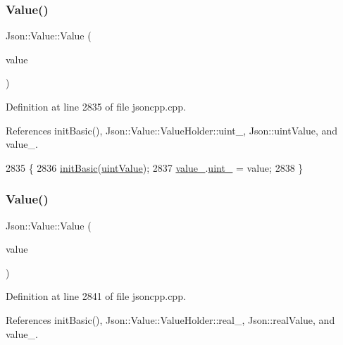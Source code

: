 \subsubsection{\texorpdfstring{Value()}{Value()}\hspace{0.1cm}{\footnotesize\ttfamily [5/12]}}
{\footnotesize\ttfamily Json\+::\+Value\+::\+Value (\begin{DoxyParamCaption}\item[{\hyperlink{class_json_1_1_value_a8b62564be8c087c6d18de180ff4e13e3}{U\+Int64}}]{value }\end{DoxyParamCaption})}



Definition at line 2835 of file jsoncpp.\+cpp.



References init\+Basic(), Json\+::\+Value\+::\+Value\+Holder\+::uint\+\_\+, Json\+::uint\+Value, and value\+\_\+.


\begin{DoxyCode}
2835                          \{
2836   \hyperlink{class_json_1_1_value_a32b86b71564157f40f880f5736be822a}{initBasic}(\hyperlink{namespace_json_a7d654b75c16a57007925868e38212b4eaea788d9a3bb00adc6d68d97d43e1ccd3}{uintValue});
2837   \hyperlink{class_json_1_1_value_aef578244546212705b9f81eb84d7e151}{value\_}.\hyperlink{union_json_1_1_value_1_1_value_holder_aab65665dc15a24a29a8e93cdeeaa7e50}{uint\_} = value;
2838 \}
\end{DoxyCode}
\mbox{\label{class_json_1_1_value_a32228cc84d83200cca8441451997996c}} 
\subsubsection{\texorpdfstring{Value()}{Value()}\hspace{0.1cm}{\footnotesize\ttfamily [6/12]}}
{\footnotesize\ttfamily Json\+::\+Value\+::\+Value (\begin{DoxyParamCaption}\item[{double}]{value }\end{DoxyParamCaption})}



Definition at line 2841 of file jsoncpp.\+cpp.



References init\+Basic(), Json\+::\+Value\+::\+Value\+Holder\+::real\+\_\+, Json\+::real\+Value, and value\+\_\+.



